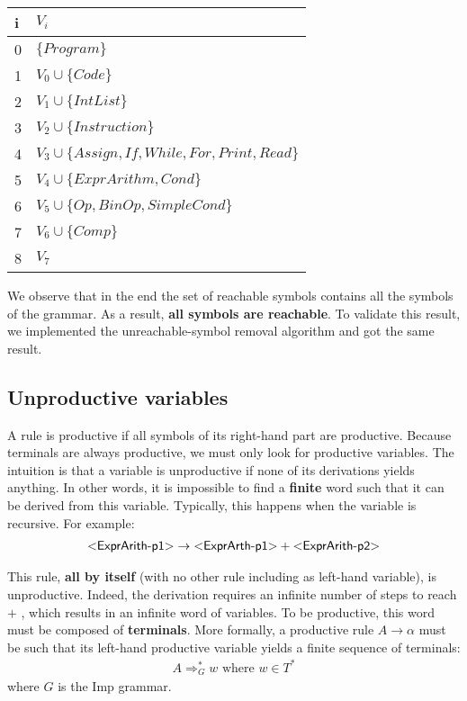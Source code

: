\begin{tabular}{|l p{35em}|} \hline
   i & $V_i$ \\ \hline
  0 & $\{Program\}$ \\ \hline
  1 & $V_0 \cup \{Code\}$ \\ \hline
  2 & $V_1 \cup \{IntList\}$ \\ \hline
  3 & $V_2 \cup \{Instruction\}$ \\ \hline
  4 & $V_3 \cup \{Assign, If, While, For, Print, Read\}$ \\ \hline
  5 & $V_4 \cup \{ExprArithm, Cond\}$ \\ \hline
  6 & $V_5 \cup \{Op, BinOp, SimpleCond\}$ \\ \hline
  7 & $V_6 \cup \{Comp\}$ \\ \hline
  8 & $V_7$ \\ \hline
\end{tabular}

We observe that in the end the set of reachable symbols contains all the symbols of the grammar. As a result, \textbf{all symbols are reachable}.
To validate this result, we implemented the unreachable-symbol removal algorithm and got the same result.

\subsection{Unproductive variables}

A rule is productive if all symbols of its right-hand part are productive. Because terminals are always productive, we must only look for
productive variables. The intuition is that a variable is unproductive if none of its derivations yields anything. In other words, it is impossible to find a \textbf{finite} word such that it can be derived from this variable. Typically, this happens when the variable is recursive. For example:
\begin{equation}
  \begin{split}
    \varstyle{ExprArith-p1} \rightarrow \varstyle{ExprArth-p1} + \varstyle{ExprArith-p2}
   \end{split}
\end{equation}

This rule, \textbf{all by itself} (with no other rule including  as left-hand variable), is unproductive.
Indeed, the derivation requires an infinite number of steps to reach $ + $ , which results in an infinite word of variables.
To be productive, this word must be composed of \textbf{terminals}.
More formally, a productive rule $A \rightarrow \alpha$ must be such that its left-hand productive variable yields a finite sequence of terminals:
\begin{equation}
  \begin{split}
    A \Rightarrow_{G}^{*} w \text{ where } w \in T^{*}
  \end{split}
\end{equation}
where $G$ is the Imp grammar.

